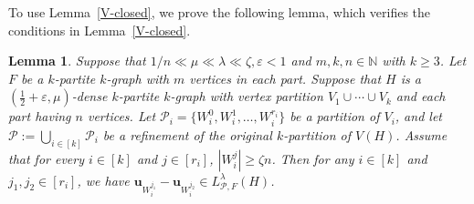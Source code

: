 \documentclass[11pt,a4paper]{article}
\newtheorem{lemma}[thm]{Lemma}
\theoremstyle{definition}
\begin{document}
To use Lemma~\ref{V-closed}, we prove the following lemma, which verifies the conditions in  Lemma~\ref{V-closed}.

\begin{lemma}\label{transferral}
    Suppose that $1/n \ll \mu \ll \lambda \ll \zeta, \varepsilon<1$ and $m,k,n\in \mathbb{N}$ with $k\geq 3$. Let $F$ be a $k$-partite $k$-graph with $m$ vertices in each part. Suppose that $H$ is a $(\frac{1}{2}+\varepsilon, \mu)$-dense $k$-partite $k$-graph with vertex partition $V_1\cup \cdots \cup V_k$ and each part having $n$ vertices. Let $\mathcal{P}_i =\{W_i^0, W_i^1,\dots,W_{i}^{r_i}\}$ be a partition of $V_i$, and let $\mathcal{P}:=\bigcup _{i\in [k]}\mathcal{P}_i$ be a refinement of the original $k$-partition of $V(H)$. Assume that for every $i\in [k]$ and $j\in [r_i]$, $|W_i^{j}|\geq \zeta n$. Then for any $i\in [k]$ and $j_1, j_2\in [r_i]$, we have $\mathbf{u}_{W_i^{j_1}} -\mathbf{u}_{W_i^{j_2}} \in  L^{\lambda}_{\mathcal{P},F}(H)$.
\end{lemma}
\end{document}
